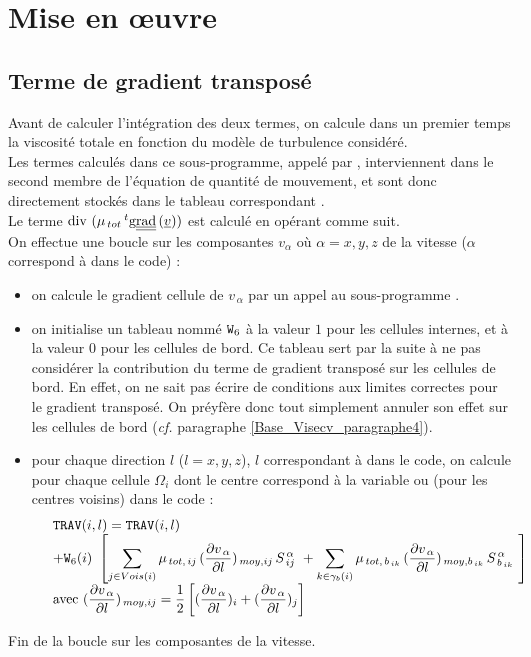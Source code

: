 \section*{Mise en \oe uvre}
\subsection*{Terme de gradient transposé}
Avant de calculer l'intégration des deux termes, on calcule dans un premier
temps la viscosité totale en fonction du modèle de turbulence considéré.\\
Les termes calculés dans ce sous-programme, appelé par , interviennent dans le second membre
de l'équation de quantité de mouvement, et sont donc directement stockés dans le
tableau correspondant  .\\
Le terme $\text{div}\,\,(\mu_{\,tot}\,^t\text{g}\underline{\underline{{\text{rad}}}}\,(\underline{v}))$ est calculé en
opérant comme suit.\\
On effectue une boucle sur les composantes $v_\alpha$ où $\alpha=x,y,z$ de la
vitesse ($\alpha$ correspond à  dans le code) :
\begin{itemize}
\item on calcule le gradient cellule de $v_{\,\alpha}$ par un appel au
sous-programme .
\item on initialise un tableau nommé $\text{\texttt{W}}_6$ à la valeur $1$ pour les cellules
internes, et à la valeur $0$ pour les cellules de bord. Ce tableau sert par la suite à ne
pas considérer la contribution du terme de gradient transposé sur les cellules
de bord. En effet, on ne sait pas écrire de conditions aux limites correctes
pour le gradient transposé. On préyf\`ere donc tout simplement annuler son
effet sur les cellules de bord (\emph{cf.} paragraphe \ref{Base_Visecv_paragraphe4}).
\item pour chaque direction $l$ ($l=x,y,z$), $l$ correspondant à 
dans le code, on calcule pour chaque cellule $\Omega_i$ dont le centre
correspond à la variable  ou
 (pour les centres voisins) dans le code :\\
\begin{equation}\notag
\begin{array}{ll}
&\text{\texttt{TRAV}}(i,l)=\text{\texttt{TRAV}}(i,l)\\
&+\text{\texttt{W}}_6(i)\ \left[\displaystyle \sum\limits_{j \in
Vois(i)} \mu_{\,tot,\,ij}\,(\frac {\partial v_{\,\alpha}}{\partial l}
)_{\,moy,ij}\,S_{\,ij}^{\,\alpha}\  +  \displaystyle \sum_{k \in
\gamma_b(i)} \mu_{\,tot,\, {b_{\,ik}}}\,(\frac {\partial v_{\,\alpha}}{\partial
l})_{\,moy,{b_{\,ik}}}\,S_{\,{b_{\,ik}}}^{\,\alpha}\ \right]\\
&\displaystyle\text{avec }
(\frac{\partial v_{\,\alpha}}{\partial l})_{\,moy,ij}=\frac{1}{2}\left[
(\frac{\partial v_{\,\alpha}}{\partial l})_i
+(\frac{\partial v_{\,\alpha}}{\partial l})_j\right]
\end{array}
\end{equation}
\end{itemize}
Fin de la boucle sur les composantes de la vitesse.\\
\\

